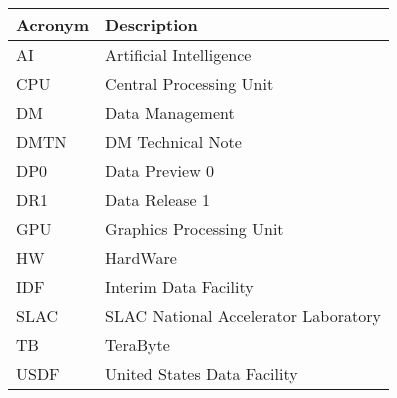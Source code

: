 \addtocounter{table}{-1}
\begin{longtable}{p{}p{}}\hline
\textbf{Acronym} & \textbf{Description}  \\\hline

AI & Artificial Intelligence \\\hline
CPU & Central Processing Unit \\\hline
DM & Data Management \\\hline
DMTN & DM Technical Note \\\hline
DP0 & Data Preview 0 \\\hline
DR1 & Data Release 1 \\\hline
GPU & Graphics Processing Unit \\\hline
HW & HardWare \\\hline
IDF & Interim Data Facility \\\hline
SLAC & SLAC National Accelerator Laboratory \\\hline
TB & TeraByte \\\hline
USDF & United States Data Facility \\\hline
\end{longtable}
